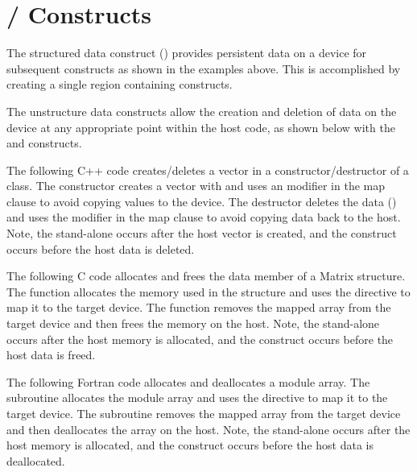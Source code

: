 \pagebreak
\section{ /  Constructs}
\label{sec:target_enter_exit_data}

The structured data construct () provides persistent data on a
device for subsequent  constructs as shown in the 
 examples above. This is accomplished by creating a single
 region containing  constructs.

The unstructure data constructs allow the creation and deletion of data on
the device at any appropriate point within the host code, as shown below 
with the  and  constructs.

The following C++ code creates/deletes a vector in a constructor/destructor 
of a class. The constructor creates a vector with 
and uses an  modifier in the map clause to avoid copying values
to the device. The destructor deletes the data ()
and uses the  modifier in the map clause to avoid copying data
back to the host. Note, the stand-alone  occurs 
after the host vector is created, and the 
construct occurs before the host data is deleted.

The following C code allocates and frees the data member of a Matrix structure.
The  function allocates the memory used in the structure and
uses the  directive to map it to the target device. The
 function removes the mapped array from the target device
and then frees the memory on the host.  Note, the stand-alone  occurs after the host memory is allocated, and the  construct occurs before the host data is freed.

The following Fortran code allocates and deallocates a module array.  The
 subroutine allocates the module array and uses the
 directive to map it to the target device. The
 subroutine removes the mapped array from the target device and
then deallocates the array on the host.  Note, the stand-alone  occurs after the host memory is allocated, and the  construct occurs before the host data is deallocated.

